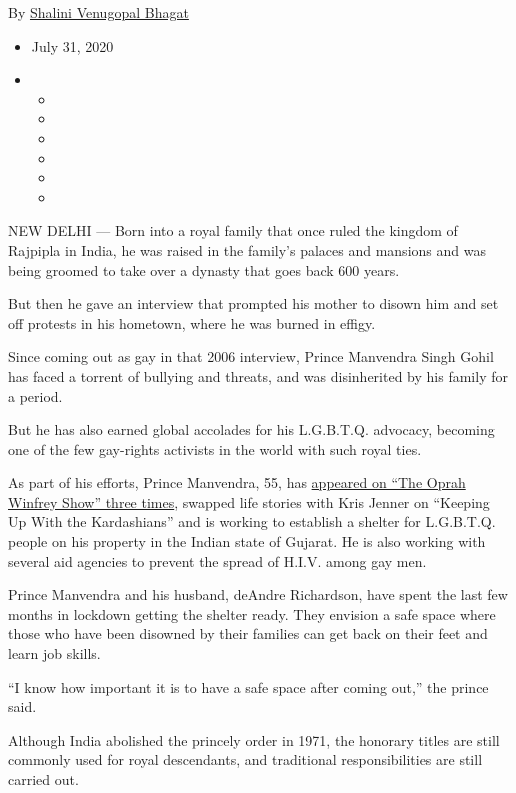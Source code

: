 By
\href{https://www.nytimes3xbfgragh.onion/by/shalini-venugopal-bhagat}{Shalini
Venugopal Bhagat}

\begin{itemize}
\item
  July 31, 2020
\item
  \begin{itemize}
  \item
  \item
  \item
  \item
  \item
  \item
  \end{itemize}
\end{itemize}

NEW DELHI --- Born into a royal family that once ruled the kingdom of
Rajpipla in India, he was raised in the family's palaces and mansions
and was being groomed to take over a dynasty that goes back 600 years.

But then he gave an interview that prompted his mother to disown him and
set off protests in his hometown, where he was burned in effigy.

Since coming out as gay in that 2006 interview, Prince Manvendra Singh
Gohil has faced a torrent of bullying and threats, and was disinherited
by his family for a period.

But he has also earned global accolades for his L.G.B.T.Q. advocacy,
becoming one of the few gay-rights activists in the world with such
royal ties.

As part of his efforts, Prince Manvendra, 55, has
\href{https://www.youtube.com/watch?v=i6a39D0PtPM}{appeared on ``The
Oprah Winfrey Show'' three times}, swapped life stories with Kris Jenner
on ``Keeping Up With the Kardashians'' and is working to establish a
shelter for L.G.B.T.Q. people on his property in the Indian state of
Gujarat. He is also working with several aid agencies to prevent the
spread of H.I.V. among gay men.

Prince Manvendra and his husband, deAndre Richardson, have spent the
last few months in lockdown getting the shelter ready. They envision a
safe space where those who have been disowned by their families can get
back on their feet and learn job skills.

``I know how important it is to have a safe space after coming out,''
the prince said.

Although India abolished the princely order in 1971, the honorary titles
are still commonly used for royal descendants, and traditional
responsibilities are still carried out.

